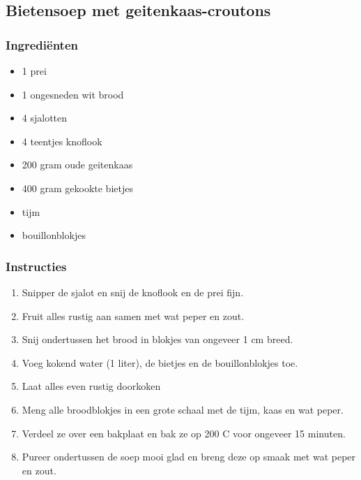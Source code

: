 \subsection{Bietensoep met geitenkaas-croutons}
\subsubsection*{Ingrediënten}
\begin{multicols}{2}
    \begin{itemize}
        \item 1 prei
        \item 1 ongesneden wit brood
        \item 4 sjalotten
        \item 4 teentjes knoflook
        \item 200 gram oude geitenkaas
        \item 400 gram gekookte bietjes
        \item tijm
        \item bouillonblokjes
    \end{itemize}
\end{multicols}

\subsubsection*{Instructies}
\begin{multicols}{2}
    \begin{enumerate}
        \item Snipper de sjalot en snij de knoflook en de prei fijn.
        \item Fruit alles rustig aan samen met wat peper en zout.
        \item Snij ondertussen het brood in blokjes van ongeveer 1 cm breed.
        \item Voeg kokend water (1 liter), de bietjes en de bouillonblokjes toe.
        \item Laat alles even rustig doorkoken
        \item Meng alle broodblokjes in een grote schaal met de tijm, kaas en wat peper.
        \item Verdeel ze over een bakplaat en bak ze op 200 C voor ongeveer 15 minuten.
        \item Pureer ondertussen de soep mooi glad en breng deze op smaak met wat peper en zout.
    \end{enumerate}
\end{multicols}